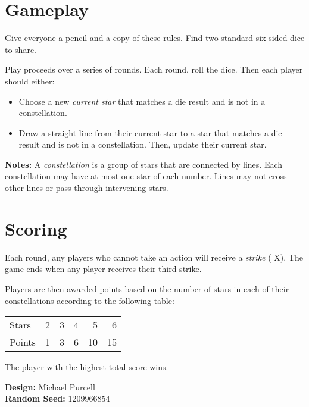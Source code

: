 \documentclass[a4paper, parskip=half]{scrartcl}
\begin{document}
\setmainfont{TeX Gyre Schola}%
\raggedright
\begin{multicols}{2}
\section*{Gameplay}
Give everyone a pencil and a copy of these rules. Find two standard six-sided dice to share.

Play proceeds over a series of rounds. Each round, roll the dice. Then each player should either:
\begin{itemize}[leftmargin=*]
	\item Choose a new \emph{current star} that matches a die result and is not in a constellation.	
	\item Draw a straight line from their current star to a star that matches a die result and is not in a constellation. Then, update their current star.
\end{itemize}

\textbf{Notes:} A \emph{constellation} is a group of stars that are connected by lines. Each constellation may have at most one star of each number. Lines may not cross other lines or pass through intervening stars.\vfill\null\columnbreak


\section*{Scoring}
Each round, any players who cannot take an action will receive a \emph{strike} ({\setmainfont{Ubuntu} X}). The game ends when any player receives their third strike.

Players are then awarded points based on the number of stars in each of their constellations according to the following table:

\begin{center}
\begin{tabular}{l rrrrr} \toprule
Stars & 2 & 3 & 4 & 5 & 6 \\
Points & \phantom{1}1 & \phantom{1}3 &\phantom{1}6 & 10 & 15 \\ \bottomrule
\end{tabular}
\end{center}

\vspace{1.0ex}

The player with the highest total score wins.

\vspace{1ex}

\textbf{Design:} Michael Purcell\\
\textbf{Random Seed:} 1209966854\vfill\null
\end{multicols}
\end{document}
